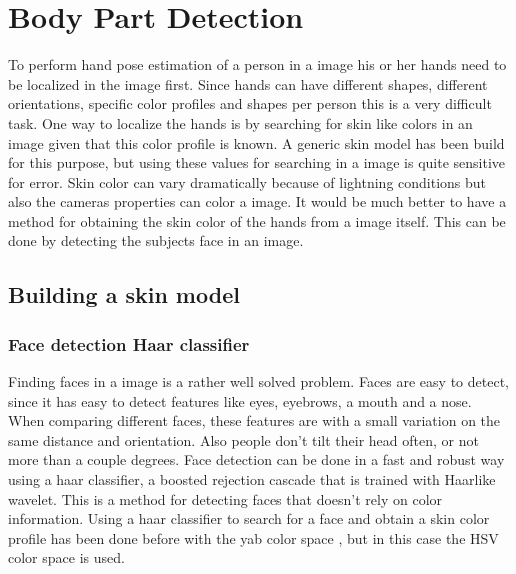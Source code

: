 
\chapter{Body Part Detection}
\label{ch:bodyparts}

To perform hand pose estimation of a person in a image his or her hands need to be localized in the image first. Since hands can have different shapes, different orientations, specific color profiles and shapes per person this is a very difficult task. One way to localize the hands is by searching for skin like colors in an image given that this color profile is known. A generic skin model has been build for this purpose\cite{Jones1999}, but using these values for searching in a image is quite sensitive for error. Skin color can vary dramatically because of lightning conditions but also the cameras properties can color a image. It would be much better to have a method for obtaining the skin color of the hands from a image itself. This can be done by detecting the subjects face in an image.

\section{Building a skin model}
\label{sec:skinmodel}

\subsection*{Face detection \- Haar classifier}
Finding faces in a image is a rather well solved problem. Faces are easy to detect, since it has easy to detect features like eyes, eyebrows, a mouth and a nose. When comparing different faces, these features are \- with a small variation \- on the same distance and orientation. Also people don't tilt their head often, or not more than a couple degrees. Face detection can be done in a fast and robust way using a haar classifier, a boosted rejection cascade that is trained with Haar\-like wavelet\cite{Lienhart2002}. This is a method for detecting faces that doesn't rely on color information. Using a haar classifier to search for a face and obtain a skin color profile has been done before with the yab color space \cite{Stenger2006}, but in this case the HSV color space is used.


